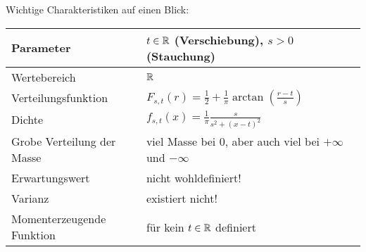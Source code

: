 \documentclass[11pt, a4paper]{book}
\begin{document}
Wichtige Charakteristiken auf einen Blick:
\begin{center}
\begin{tabular}[h]{|l|l|}
\hline
Parameter& $t\in \mathbb{R}$ (Verschiebung), $s>0$ (Stauchung)\\
\hline
Wertebereich & $\mathbb{R}$\\
\hline
Verteilungsfunktion & $F_{s,t}(r)= \frac{1}{2}+\frac{1}{\pi} \arctan(\frac{r-t}{s})$\\
\hline
Dichte & $f_{s,t} (x)=\frac{1}{\pi}\frac{s}{s^2+(x-t)^2}$\\
\hline
Grobe Verteilung der Masse & viel Masse bei $0$, aber auch viel bei $+\infty$ und $-\infty$\\
\hline
Erwartungswert& nicht wohldefiniert! \\
\hline
Varianz & existiert nicht!\\
\hline
Momenterzeugende Funktion& f\"ur kein $t\in\mathbb{R}$ definiert\\
\hline
\end{tabular}
\end{center}
\end{document}
